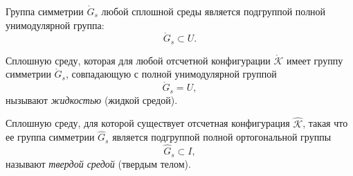\begin{theorem*}
	Группа симметрии $\mathring{G}_s$ любой сплошной среды является подгруппой полной унимодулярной группа:
	\begin{equation*}
		\mathring{G}_s \subset U.
	\end{equation*}
\end{theorem*}

\begin{definition*}
	Сплошную среду, которая для любой отсчетной конфигурации $\mathring{\mathcal{K}}$ имеет группу симметрии $\mathring{G}_s$, совпадающую с полной унимодулярной группой 
	\begin{equation*}
		\mathring{G}_{s} = U,
	\end{equation*}
	нызывают \textit{жидкостью} (жидкой средой).
\end{definition*}

\begin{definition*}
	Сплошную среду, для которой существует отсчетная конфигурация $\hat{\mathcal{K}}$, такая что ее группа симметрии $\hat{G}_s$ является подгруппой полной ортогональной группы
	\begin{equation*}
		\hat{G}_s \subset I,
	\end{equation*}
	называют \textit{твердой средой} (твердым телом). 
\end{definition*}
